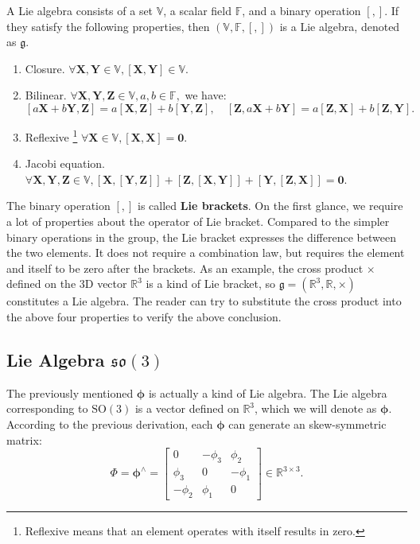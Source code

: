 A Lie algebra consists of a set $\mathbb{V}$, a scalar field $\mathbb{F}$, and a binary operation $[,]$. If they satisfy the following properties, then $(\mathbb{V}, \mathbb{F}, [,])$ is a Lie algebra, denoted as $\mathfrak{g}$.

\begin{enumerate}
    \item Closure.  $\forall \mathbf{X}, \mathbf{Y} \in \mathbb{V}, [\mathbf{X}, \mathbf{Y}] \in \mathbb{V}$.
    \item Bilinear. $\forall \mathbf{X},\mathbf{Y},\mathbf{Z} \in \mathbb{V}, a,b \in \mathbb{F }, $ we have:
    \[
    [a\mathbf{X}+b\mathbf{Y}, \mathbf{Z}] = a[\mathbf{X}, \mathbf{Z}] + b [ \mathbf{Y}, \mathbf{Z} ], \quad [\mathbf{Z}, a \mathbf{X}+b\mathbf{Y}] = a [\mathbf{Z}, \mathbf{X} ]+ b [\mathbf{Z},\mathbf{Y}] .
    \]
    \item Reflexive \footnote{ Reflexive means that an element operates with itself results in zero. } $\forall \mathbf{X} \in \mathbb{V}, [\mathbf{X},\mathbf{X}] = \mathbf{0}$.
    \item Jacobi equation. $\forall \mathbf{X},\mathbf{Y},\mathbf{Z} \in \mathbb{V}, [\mathbf{X}, [ \mathbf{Y},\mathbf{Z}] ] + [\mathbf{Z}, [\mathbf{X},\mathbf{Y}] ] + [\mathbf{Y}, [\mathbf{Z}, \mathbf{X}]] =\mathbf{0}$.
\end{enumerate}
The binary operation $[,]$ is called \textbf{Lie brackets}. On the first glance, we require a lot of properties about the operator of Lie bracket.  Compared to the simpler binary operations in the group, the Lie bracket expresses the difference between the two elements. It does not require a combination law, but requires the element and itself to be zero after the brackets. As an example, the cross product $\times$ defined on the 3D vector $\mathbb{R}^3$ is a kind of Lie bracket, so $\mathfrak{g} = (\mathbb{R}^3, \mathbb{R}, \times)$ constitutes a Lie algebra. The reader can try to substitute the cross product into the above four properties to verify the above conclusion.

\subsection{Lie Algebra $\mathfrak{so}(3)$}
The previously mentioned $\boldsymbol{\phi}$ is actually a kind of Lie algebra. The Lie algebra corresponding to $\mathrm{SO}(3)$ is a vector defined on $\mathbb{R}^3$, which we will denote as $\boldsymbol{\phi}$. According to the previous derivation, each $\boldsymbol{\phi}$ can generate an skew-symmetric matrix:
\begin{equation}
\label{eq:phi}
\boldsymbol{\varPhi} = \boldsymbol{\phi}^{\wedge} = \left[ {\begin{array}{*{20}{c}}
    0&{ - {\phi _3}}&{{\phi _2}}\\
    {{\phi _3}}&0&{ - {\phi _1}}\\
    { - {\phi _2}}&{{\phi _1}}&0
    \end{array}} \right] \in \mathbb{R}^{3 \times 3}.
\end{equation}

